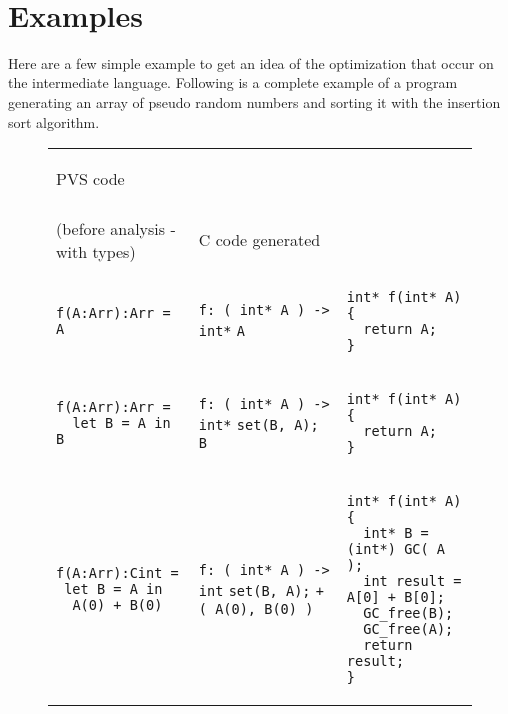 \documentclass[12pt,a4paper]{article}
\newcommand{\cl}[1]{\texttt{#1}}
\begin{document}
\newpage
\
\newpage

\section{Examples}
Here are a few simple example to get an idea of the optimization that occur on the intermediate language. Following is a complete example of a program generating an array of pseudo random numbers and sorting it with the insertion sort algorithm.

\begin{figure}[!ht]
\begin{tabular}{|p{5.2cm}|p{5.8cm}|p{6cm}|}
\hline
\begin{center}
PVS code
\end{center} &
\begin{center}
Intermediate language code\\
(before analysis - with types)
\end{center} &
\begin{center}
C code generated
\end{center} \\ \hline

\begin{lstlisting}
f(A:Arr):Arr = A
\end{lstlisting} &
\cl{f: ( int* A ) -> int*} \newline
\cl{A} &
\begin{lstlisting}
int* f(int* A) {
  return A;
}
\end{lstlisting} \\ \hline

\begin{lstlisting}
f(A:Arr):Arr =
  let B = A in B
\end{lstlisting} &
\cl{f: ( int* A ) -> int*} \newline
\cl{set(B, A);} \newline
\cl{B} &
\begin{lstlisting}
int* f(int* A) {
  return A;
}
\end{lstlisting} \\ \hline

\begin{lstlisting}
f(A:Arr):Cint =
 let B = A in
  A(0) + B(0)
\end{lstlisting} &
\cl{f: ( int* A ) -> int} \newline
\cl{set(B, A);} \newline
\cl{+( A(0), B(0) )} &
\begin{lstlisting}
int* f(int* A) {
  int* B = (int*) GC( A );
  int result = A[0] + B[0];
  GC_free(B);
  GC_free(A);
  return result;
}
\end{lstlisting} \\ \hline


\end{tabular}
\end{figure}
\end{document}
